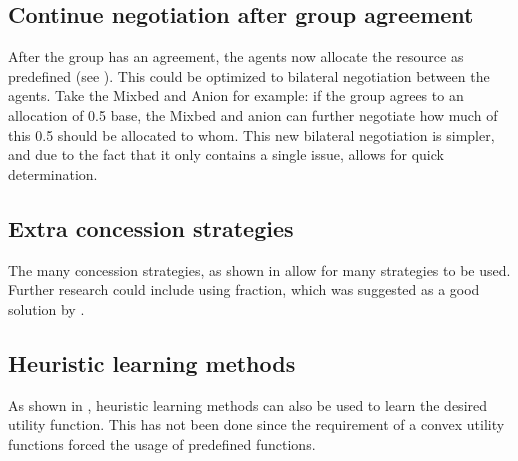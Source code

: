 \subsection{Continue negotiation after group agreement}
After the group has an agreement, the agents now allocate the resource as predefined (see ). This could be optimized to bilateral negotiation between the agents. Take the Mixbed and Anion for example: if the group agrees to an allocation of 0.5 base, the Mixbed and anion can further negotiate how much of this 0.5 should be allocated to whom. This new bilateral negotiation is simpler, and due to the fact that it only contains a single issue, allows for quick determination.

\subsection{Extra concession strategies}
The many concession strategies, as shown in  allow for many strategies to be used. Further research could include using fraction, which was suggested as a good solution by \citet{wu2009efficient}. 
\subsection{Heuristic learning methods}
As shown in , heuristic learning methods can also be used to learn the desired utility function. This has not been done since the requirement of a convex utility functions forced the usage of predefined functions.



\todos
\clearpage
\nocite{*}
